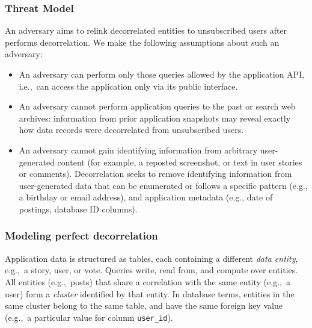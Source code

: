 \subsubsection{Threat Model} 
An adversary aims to relink decorrelated entities to unsubscribed users after \sys{}
performs decorrelation. We make the following assumptions about such an adversary: 
\begin{itemize}
    \item An adversary can perform only those queries allowed by the application API, 
i.e.,\ can access the application only via its public interface. 

    \item An adversary cannot perform application queries to the past or search web archives:
    information from prior application snapshots may reveal 
    exactly how data records were decorrelated from unsubscribed users. 

    \item An adversary cannot gain identifying information from arbitrary user-generated content (for
        example, a reposted screenshot, or text in user stories or comments). Decorrelation seeks to
        remove identifying information from user-generated data that can be enumerated or follows a
        specific pattern (e.g., a birthday or email address), and application metadata (e.g., date
        of postings, database ID columns).
\end{itemize}

\subsubsection{Modeling perfect decorrelation}
Application data is structured as tables, each containing a different \emph{data entity}, e.g.,\ a
story, user, or vote. Queries write, read from, and compute over entities.  All entities (e.g.,\
posts) that share a correlation with the same entity (e.g.,\ a user) form a \emph{cluster}
identified by that entity. In database terms, entities in the same cluster belong to the same table,
and have the same foreign key value (e.g.,\ a particular value for column \texttt{user\_id}). 

